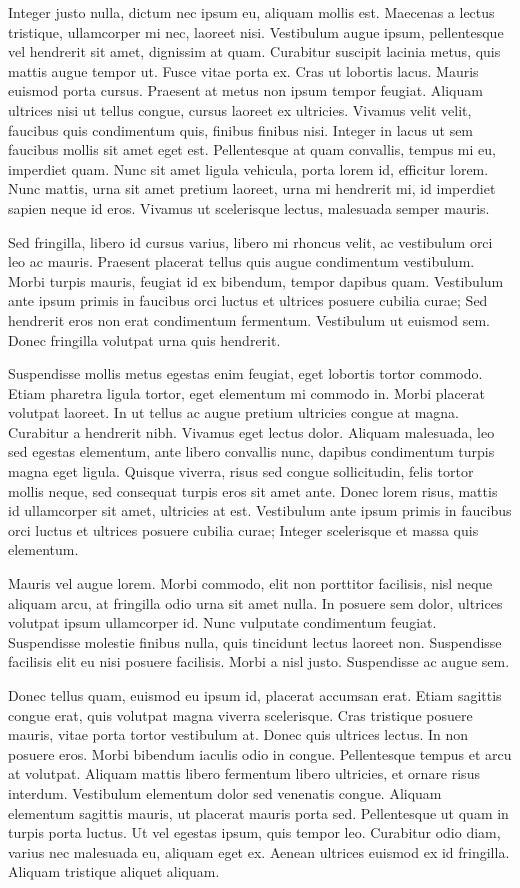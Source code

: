 Integer justo nulla, dictum nec ipsum eu, aliquam mollis est. Maecenas a lectus tristique, ullamcorper mi nec, laoreet nisi. Vestibulum augue ipsum, pellentesque vel hendrerit sit amet, dignissim at quam. Curabitur suscipit lacinia metus, quis mattis augue tempor ut. Fusce vitae porta ex. Cras ut lobortis lacus. Mauris euismod porta cursus. Praesent at metus non ipsum tempor feugiat. Aliquam ultrices nisi ut tellus congue, cursus laoreet ex ultricies. Vivamus velit velit, faucibus quis condimentum quis, finibus finibus nisi. Integer in lacus ut sem faucibus mollis sit amet eget est. Pellentesque at quam convallis, tempus mi eu, imperdiet quam. Nunc sit amet ligula vehicula, porta lorem id, efficitur lorem. Nunc mattis, urna sit amet pretium laoreet, urna mi hendrerit mi, id imperdiet sapien neque id eros. Vivamus ut scelerisque lectus, malesuada semper mauris.

Sed fringilla, libero id cursus varius, libero mi rhoncus velit, ac vestibulum orci leo ac mauris. Praesent placerat tellus quis augue condimentum vestibulum. Morbi turpis mauris, feugiat id ex bibendum, tempor dapibus quam. Vestibulum ante ipsum primis in faucibus orci luctus et ultrices posuere cubilia curae; Sed hendrerit eros non erat condimentum fermentum. Vestibulum ut euismod sem. Donec fringilla volutpat urna quis hendrerit.

Suspendisse mollis metus egestas enim feugiat, eget lobortis tortor commodo. Etiam pharetra ligula tortor, eget elementum mi commodo in. Morbi placerat volutpat laoreet. In ut tellus ac augue pretium ultricies congue at magna. Curabitur a hendrerit nibh. Vivamus eget lectus dolor. Aliquam malesuada, leo sed egestas elementum, ante libero convallis nunc, dapibus condimentum turpis magna eget ligula. Quisque viverra, risus sed congue sollicitudin, felis tortor mollis neque, sed consequat turpis eros sit amet ante. Donec lorem risus, mattis id ullamcorper sit amet, ultricies at est. Vestibulum ante ipsum primis in faucibus orci luctus et ultrices posuere cubilia curae; Integer scelerisque et massa quis elementum.

Mauris vel augue lorem. Morbi commodo, elit non porttitor facilisis, nisl neque aliquam arcu, at fringilla odio urna sit amet nulla. In posuere sem dolor, ultrices volutpat ipsum ullamcorper id. Nunc vulputate condimentum feugiat. Suspendisse molestie finibus nulla, quis tincidunt lectus laoreet non. Suspendisse facilisis elit eu nisi posuere facilisis. Morbi a nisl justo. Suspendisse ac augue sem.

Donec tellus quam, euismod eu ipsum id, placerat accumsan erat. Etiam sagittis congue erat, quis volutpat magna viverra scelerisque. Cras tristique posuere mauris, vitae porta tortor vestibulum at. Donec quis ultrices lectus. In non posuere eros. Morbi bibendum iaculis odio in congue. Pellentesque tempus et arcu at volutpat. Aliquam mattis libero fermentum libero ultricies, et ornare risus interdum. Vestibulum elementum dolor sed venenatis congue. Aliquam elementum sagittis mauris, ut placerat mauris porta sed. Pellentesque ut quam in turpis porta luctus. Ut vel egestas ipsum, quis tempor leo. Curabitur odio diam, varius nec malesuada eu, aliquam eget ex. Aenean ultrices euismod ex id fringilla. Aliquam tristique aliquet aliquam.


